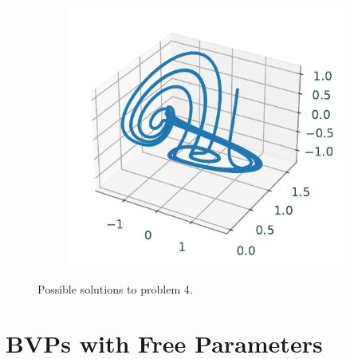 \begin{figure}[H]
\begin{subfigure}[b]{.3\textwidth}
    \end{subfigure}
    \begin{subfigure}[b]{.3\textwidth}
        \centering
        \includegraphics[width = \textwidth ]{figures/problem43.pdf}
    \end{subfigure}
    \caption{Possible solutions to problem 4.}
    \label{fig:bvpintro:bvp4}
\end{figure}


\section*{BVPs with Free Parameters}

